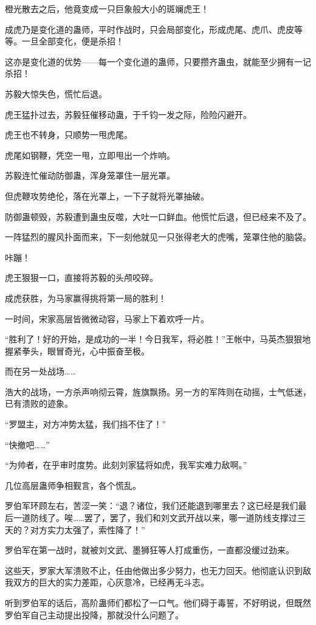 \begin{this_body}
橙光散去之后，他竟变成一只巨象般大小的斑斓虎王！

成虎乃是变化道的蛊师，平时作战时，只会局部变化，形成虎尾、虎爪、虎皮等等。一旦全部变化，便是杀招！

这亦是变化道的优势——每一个变化道的蛊师，只要攒齐蛊虫，就能至少拥有一记杀招！

苏毅大惊失色，慌忙后退。

虎王猛扑过去，苏毅狂催移动蛊，于千钧一发之际，险险闪避开。

虎王也不转身，只顺势一甩虎尾。

虎尾如钢鞭，凭空一甩，立即甩出一个炸响。

苏毅连忙催动防御蛊，浑身笼罩住一层光罩。

但虎鞭攻势绝伦，落在光罩上，一下子就将光罩抽破。

防御蛊顿毁，苏毅遭到蛊虫反噬，大吐一口鲜血。他慌忙后退，但已经来不及了。

一阵猛烈的腥风扑面而来，下一刻他就见一只张得老大的虎嘴，笼罩住他的脑袋。

咔蹦！

虎王狠狠一口，直接将苏毅的头颅咬碎。

成虎获胜，为马家赢得挑将第一局的胜利！

一时间，宋家高层皆微微动容，马家上下着欢呼一片。

“胜利了！好的开始，是成功的一半！今日我军，将必胜！”王帐中，马英杰狠狠地握紧拳头，眼冒奇光，心中振奋至极。

而在另一处战场……

浩大的战场，一方杀声响彻云霄，旌旗飘扬。另一方的军阵则在动摇，士气低迷，已有溃败的迹象。

“罗盟主，对方冲势太猛，我们挡不住了！”

“快撤吧……”

“为帅者，在乎审时度势。此刻刘家猛将如虎，我军实难力敌啊。”

几位高层蛊师争相觐言，各个慌乱。

罗伯军环顾左右，苦涩一笑：“退？诸位，我们还能退到哪里去？这已经是我们最后一道防线了。唉……罢了，罢了，我们和刘文武开战以来，哪一道防线支撑过三天的？对方实力太强了，索性降了！”

罗伯军在第一战时，就被刘文武、墨狮狂等人打成重伤，一直都没缓过劲来。

这些天，罗家大军溃败不止，任由他做出多少努力，也无力回天。他彻底认识到敌我双方的巨大的实力差距，心灰意冷，已经再无斗志。

听到罗伯军的话后，高阶蛊师们都松了一口气。他们碍于毒誓，不好明说，但既然罗伯军自己主动提出投降，那就没什么问题了。


\end{this_body}
